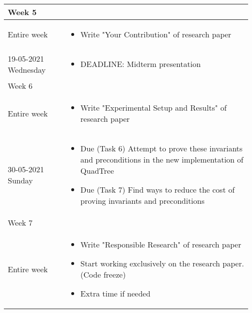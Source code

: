 \documentclass[english]{article}
\begin{document}
\begin{center}
\begin{tabular}{| p{} | p{} | }
\multicolumn{2}{l}{Week 5} \\
\hline

Entire week    & 
\begin{minipage}[t]{0.65\textwidth} \begin{itemize}
    \item Write "Your Contribution" of research paper
\end{itemize} \end{minipage} \\   
\hline

19-05-2021 Wednesday    & 
\begin{minipage}[t]{0.65\textwidth} \begin{itemize}
    \item DEADLINE: Midterm presentation
\end{itemize} \end{minipage} \\   
\hline

\multicolumn{2}{l}{Week 6} \\
\hline

Entire week    & 
\begin{minipage}[t]{0.65\textwidth} \begin{itemize}
    \item Write "Experimental Setup and Results" of research paper
\end{itemize} \end{minipage} \\   
\hline

30-05-2021 Sunday    & 
\begin{minipage}[t]{0.65\textwidth} \begin{itemize}
    \item Due (Task 6) Attempt to prove these invariants and preconditions in the new implementation of QuadTree
    \item Due (Task 7) Find ways to reduce the cost of proving invariants and preconditions
\end{itemize} \end{minipage} \\   
\hline

\multicolumn{2}{l}{Week 7} \\
\hline

Entire week    & 
\begin{minipage}[t]{0.65\textwidth} \begin{itemize}
    \item Write "Responsible Research" of research paper
    \item Start working exclusively on the research paper. (Code freeze)
    \item Extra time if needed
\end{itemize} \end{minipage} \\   
\hline


\end{tabular}
\end{center}
\end{document}
